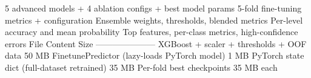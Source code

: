 {}\markdownRendererPipe{}  \markdownRendererPipe{} 5 advanced models + 4 ablation configs + best model params \markdownRendererPipe{}\markdownRendererSoftLineBreak
{}\markdownRendererPipe{}  \markdownRendererPipe{} 5-fold fine-tuning metrics + configuration \markdownRendererPipe{}\markdownRendererSoftLineBreak
{}\markdownRendererPipe{}  \markdownRendererPipe{} Ensemble weights, thresholds, blended metrics \markdownRendererPipe{}\markdownRendererSoftLineBreak
{}\markdownRendererPipe{}  \markdownRendererPipe{} Per-level accuracy and mean probability \markdownRendererPipe{}\markdownRendererSoftLineBreak
{}\markdownRendererPipe{}  \markdownRendererPipe{} Top features, per-class metrics, high-confidence errors \markdownRendererPipe{}\markdownRendererInterblockSeparator
{}
\markdownRendererSectionEnd \markdownRendererSectionBegin
{}\markdownRendererInterblockSeparator
{}\markdownRendererPipe{} File \markdownRendererPipe{} Content \markdownRendererPipe{} Size \markdownRendererPipe{}\markdownRendererSoftLineBreak
{}\markdownRendererPipe{}------\markdownRendererPipe{}---------\markdownRendererPipe{}------\markdownRendererPipe{}\markdownRendererSoftLineBreak
{}\markdownRendererPipe{}  \markdownRendererPipe{} XGBoost + scaler + thresholds + OOF data \markdownRendererPipe{} \markdownRendererTilde{}50 MB \markdownRendererPipe{}\markdownRendererSoftLineBreak
{}\markdownRendererPipe{}  \markdownRendererPipe{} FinetunePredictor (lazy-loads PyTorch model) \markdownRendererPipe{} \markdownRendererTilde{}1 MB \markdownRendererPipe{}\markdownRendererSoftLineBreak
{}\markdownRendererPipe{}  \markdownRendererPipe{} PyTorch state dict (full-dataset retrained) \markdownRendererPipe{} \markdownRendererTilde{}35 MB \markdownRendererPipe{}\markdownRendererSoftLineBreak
{}\markdownRendererPipe{}  \markdownRendererPipe{} Per-fold best checkpoints \markdownRendererPipe{} \markdownRendererTilde{}35 MB each \markdownRendererPipe{}
\markdownRendererSectionEnd 
\markdownRendererSectionEnd 
\markdownRendererSectionEnd \markdownRendererDocumentEnd